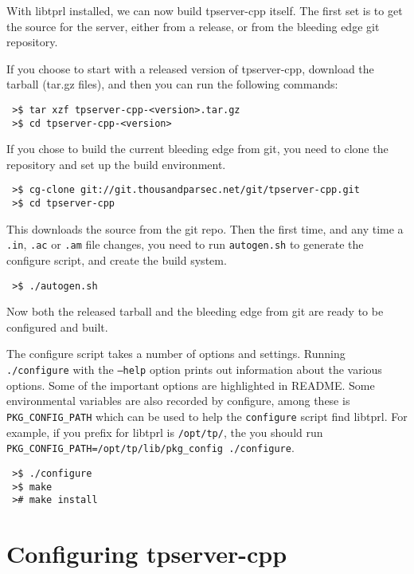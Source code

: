 \documentclass[a4paper,11pt]{report}
\begin{document}


With libtprl installed, we can now build tpserver-cpp itself. The first set is to get the source for the server, either from a release, or from the bleeding edge git repository.

If you choose to start with a released version of tpserver-cpp, download the tarball (tar.gz files), and then you can run the following commands:

\begin{verbatim}
 >$ tar xzf tpserver-cpp-<version>.tar.gz
 >$ cd tpserver-cpp-<version>
\end{verbatim}

If you chose to build the current bleeding edge from git, you need to clone the repository and set up the build environment.

\begin{verbatim}
 >$ cg-clone git://git.thousandparsec.net/git/tpserver-cpp.git
 >$ cd tpserver-cpp
\end{verbatim}

This downloads the source from the git repo.
Then the first time, and any time a \texttt{.in}, \texttt{.ac} or \texttt{.am} file changes, you need to run \texttt{autogen.sh} to generate the configure script, and create the build system.

\begin{verbatim}
 >$ ./autogen.sh
\end{verbatim}

Now both the released tarball and the bleeding edge from git are ready to be configured and built.

The configure script takes a number of options and settings. Running \texttt{./configure} with the  \texttt{--help} option prints out information about the various options. Some of the important options are highlighted in README. Some environmental variables are also recorded by configure, among these is \texttt{PKG\_CONFIG\_PATH} which can be used to help the \texttt{configure} script find libtprl. For example, if you prefix for libtprl is \texttt{/opt/tp/}, the you should run \texttt{PKG\_CONFIG\_PATH=/opt/tp/lib/pkg\_config ./configure}.


\begin{verbatim}
 >$ ./configure
 >$ make
 ># make install
\end{verbatim}

\chapter{Configuring tpserver-cpp}
\label{chap:configure}
\end{document}
